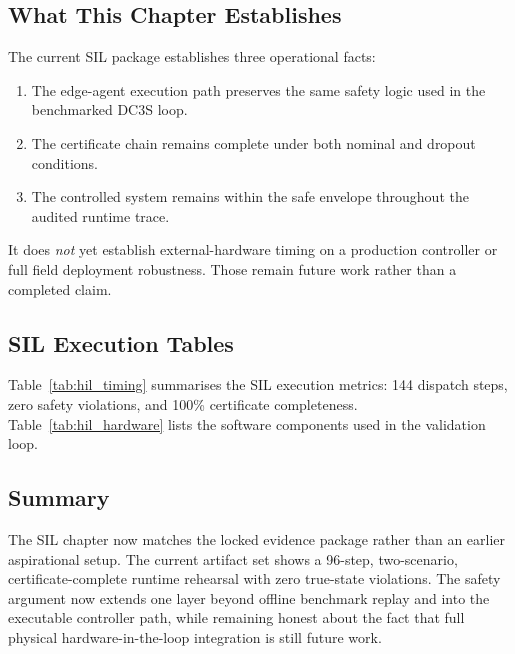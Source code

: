 \subsection{What This Chapter Establishes}

The current SIL package establishes three operational facts:

\begin{enumerate}
  \item The edge-agent execution path preserves the same safety logic used in
    the benchmarked DC3S loop.
  \item The certificate chain remains complete under both nominal and dropout
    conditions.
  \item The controlled system remains within the safe envelope throughout the audited
    runtime trace.
\end{enumerate}

It does \emph{not} yet establish external-hardware timing on a production
controller or full field deployment robustness.  Those remain future work
rather than a completed claim.

\subsection{SIL Execution Tables}

Table~\ref{tab:hil_timing} summarises the SIL execution metrics: 144
dispatch steps, zero safety violations, and 100\% certificate
completeness.  Table~\ref{tab:hil_hardware} lists the software components
used in the validation loop.



\subsection{Summary}

The SIL chapter now matches the locked evidence package rather than
an earlier aspirational setup.  The current artifact set shows a 96-step,
two-scenario, certificate-complete runtime rehearsal with zero true-state
violations.  The safety argument now extends one layer beyond offline benchmark
replay and into the executable controller path, while remaining honest about
the fact that full physical hardware-in-the-loop integration is still
future work.


